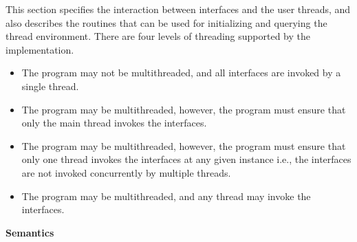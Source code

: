 This section specifies the interaction between \openshmem{} interfaces and the
user threads, and also describes the routines that can be used for initializing and 
querying the thread environment. There are four levels of threading supported by
the \openshmem{} implementation.
 
\begin{itemize}
\item {\bf {}} The \openshmem{} program may not be multithreaded, 
and all \openshmem{} interfaces are invoked by a single thread. 

\item {\bf {}}
The \openshmem{} program may be multithreaded, however, the 
program must ensure that only the main thread invokes the \openshmem{}
interfaces.

\item {\bf {}} 
The \openshmem{} program may be multithreaded, however, the 
program must ensure that only one thread invokes the \openshmem{}
interfaces at any given instance i.e., the \openshmem{} interfaces 
are not invoked concurrently by multiple threads.

\item {\bf {}}
The \openshmem{} program may be multithreaded, and any 
thread may invoke the \openshmem{} interfaces.
\end{itemize}

\hspace{-15pt}
{\bf Semantics}

